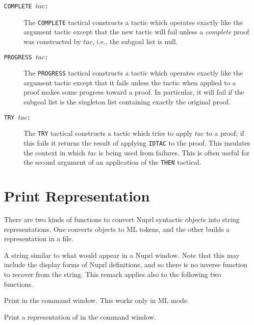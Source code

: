 \begin{description}
\item [{\tt COMPLETE $tac$:}]  The {\tt COMPLETE}
tactical constructs a tactic
which operates exactly like the argument tactic except that the new tactic
will fail unless a {\em complete} proof was constructed by $tac$, i.e.,
the subgoal list is null.  

\item [{\tt PROGRESS $tac$:}] The {\tt PROGRESS}
tactical constructs a tactic
which operates exactly like the argument tactic except that it fails unless
the tactic when applied to a proof makes some progress toward a proof.  In
particular, it will fail if the subgoal list is the singleton list
containing exactly the original proof.  

\item [{\tt TRY $tac$:}]  The {\tt TRY}
tactical constructs a tactic which
tries to apply $tac$ to a proof; if this fails it returns the result
of applying {\tt IDTAC} to the proof.  This insulates the context in which
{\em tac} is being used from failures.  This is often
useful for the second argument of an application of the {\tt THEN}
tactical.

\end{description}




\section{Print Representation}

There are two kinds of functions to convert Nuprl syntactic objects
into string representations.  One converts objects to ML tokens, and the
other builds a representation in a file.

  A string similar to what would
appear in a Nuprl window.  Note that this may include the display forms of
Nuprl definitions, and so there is no inverse function to recover 
from the string.  This remark applies also to the following two functions.



Print  in the command window.  This works only in ML mode.

Print a representation of  in the command window.

